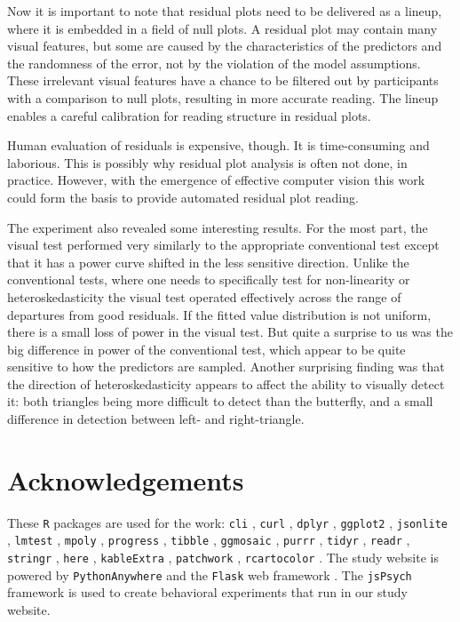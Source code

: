 \documentclass[]{interact}
\theoremstyle{plain}%
\theoremstyle{definition}
\theoremstyle{remark}
\begin{document}
Now it is important to note that residual plots need to be delivered as
a lineup, where it is embedded in a field of null plots. A residual plot
may contain many visual features, but some are caused by the
characteristics of the predictors and the randomness of the error, not
by the violation of the model assumptions. These irrelevant visual
features have a chance to be filtered out by participants with a
comparison to null plots, resulting in more accurate reading. The lineup
enables a careful calibration for reading structure in residual plots.

Human evaluation of residuals is expensive, though. It is time-consuming
and laborious. This is possibly why residual plot analysis is often not
done, in practice. However, with the emergence of effective computer
vision this work could form the basis to provide automated residual plot
reading.

The experiment also revealed some interesting results. For the most
part, the visual test performed very similarly to the appropriate
conventional test except that it has a power curve shifted in the less
sensitive direction. Unlike the conventional tests, where one needs to
specifically test for non-linearity or heteroskedasticity the visual
test operated effectively across the range of departures from good
residuals. If the fitted value distribution is not uniform, there is a
small loss of power in the visual test. But quite a surprise to us was
the big difference in power of the conventional test, which appear to be
quite sensitive to how the predictors are sampled. Another surprising
finding was that the direction of heteroskedasticity appears to affect
the ability to visually detect it: both triangles being more difficult
to detect than the butterfly, and a small difference in detection
between left- and right-triangle.

\hypertarget{acknowledgements}{%
\section*{Acknowledgements}\label{acknowledgements}}

These \texttt{R} packages are used for the work: \texttt{cli}
\citep{cli}, \texttt{curl} \citep{curl}, \texttt{dplyr} \citep{dplyr},
\texttt{ggplot2} \citep{ggplot2}, \texttt{jsonlite} \citep{jsonlite},
\texttt{lmtest} \citep{lmtest}, \texttt{mpoly} \citep{mpoly},
\texttt{progress} \citep{progress}, \texttt{tibble} \citep{tibble},
\texttt{ggmosaic} \citep{ggmosaic}, \texttt{purrr} \citep{purrr},
\texttt{tidyr} \citep{tidyr}, \texttt{readr} \citep{readr},
\texttt{stringr} \citep{stringr}, \texttt{here} \citep{here},
\texttt{kableExtra} \citep{kableextra}, \texttt{patchwork}
\citep{patchwork}, \texttt{rcartocolor} \citep{rcartocolor}. The study
website is powered by \texttt{PythonAnywhere} \citep{pythonanywhere} and
the \texttt{Flask} web framework \citep{flask}. The \texttt{jsPsych}
framework \citep{jspsych} is used to create behavioral experiments that
run in our study website.
\end{document}
